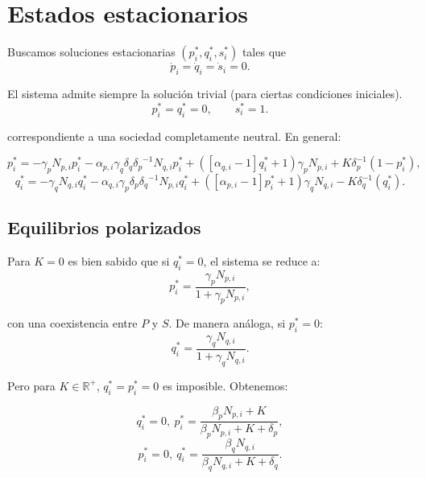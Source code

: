\documentclass[11pt,a4paper]{article}
\begin{document}
\section{Estados estacionarios}

Buscamos soluciones estacionarias $(p_i^*, q_i^*, s_i^*)$ tales que
\begin{equation}
    \dot p_i = \dot q_i = \dot s_i = 0.
\end{equation}

El sistema admite siempre la solución trivial (para ciertas condiciones iniciales).
\begin{equation}
    p_i^* = q_i^* = 0, \qquad s_i^* = 1.
\end{equation}

correspondiente a una sociedad completamente neutral. En general:

\begin{equation}
        p_i^*=-\gamma_pN_{p,i}p_i^*-\alpha_{p,i}\gamma_q\delta_q{\delta_p}^{-1}N_{q,i}p_i^*+([\alpha_{q,i}-1]q_i^*+1)\gamma_p N_{p,i}+K\delta_p^{-1}(1-p_i^*),
\end{equation}
\begin{equation}
    q_i^*=-\gamma_qN_{q,i}q_i^*-\alpha_{q,i}\gamma_p\delta_p{\delta_q}^{-1}N_{p,i}q_i^*+([\alpha_{p,i}-1]p_i^*+1)\gamma_q N_{q,i}-K\delta_q^{-1}(q_i^*).

\end{equation}


\subsection{Equilibrios polarizados}

Para $K=0$ es bien sabido que si $q_i^* = 0$, el sistema se reduce a:
\begin{equation}
    p_i^* = \frac{\gamma_p N_{p,i}}{1 + \gamma_p N_{p,i}},
\end{equation}

con una coexistencia entre $P$ y $S$. De manera análoga, si $p_i^* = 0$:
\begin{equation}
    q_i^* = \frac{\gamma_q N_{q,i}}{1 + \gamma_q N_{q,i}}.
\end{equation}

Pero para $K \in \mathbb{R^+}$, $q_i^* = p_i^*=0$ es imposible. Obtenemos: 

\begin{equation}
    q_i^*=0,\ p_i^* = \frac{\beta_p N_{p,i}+K}{\beta_p N_{p,i}+K+\delta_p},
\end{equation}
\begin{equation}
    p_i^*=0,\ q_i^* = \frac{\beta_q N_{q,i}}{\beta_q N_{q,i}+K+\delta_q}.
\end{equation}    
\end{document}
